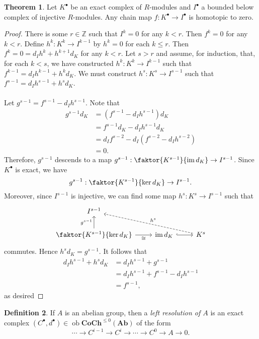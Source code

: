 \documentclass[10pt,letterpaper,cm]{nupset}
\theoremstyle{definition}
\newtheorem{definition}{Definition}[subsection]
\theoremstyle{theorem}
\newtheorem{theorem}[definition]{Theorem}
\theoremstyle{remark}
\newcommand{\Z}{\mathbb Z}
\newcommand{\1}{\mathbf{1}}
\newcommand{\0}{\vec 0}
\DeclareMathOperator{\im}{im}
\DeclareMathOperator{\ob}{ob}
\begin{document}
\begin{theorem}
Let $K^{\bullet}$ be an exact complex of $R$-modules and $I^{\bullet}$ a bounded below complex of injective $R$-modules. Any chain map $f: K^{\bullet} \to I^{\bullet}$ is homotopic to zero.
\end{theorem}
\begin{proof}
There is some $r\in \Z$ such that $I^k =0$ for any $k<r$. Then $f^k =0$ for any $k<r$. Define $h^k: K^k \to I^{k-1}$ by $h^k =0$ for each $k\leq r$. Then $f^{k} = 0 = d_I{h^{k}} + h^{k+1}{d_K}$ for any $k <r$. Let $s> r$ and assume, for induction, that, for each $k<s$, we have constructed $h^k : K^k \to I^{k-1}$ such that $f^{k-1} = d_I{h^{k-1}} + h^{k}{d_K}$. We must construct $h^s : K^s \to I^{s-1}$ such that $f^{s-1} = d_I{h^{s-1}} + h^{s}{d_K}$.
\\ \\ Let $g^{s-1} = f^{s-1} - d_I{h^{s-1}}$. Note that 
\begin{align*}
g^{s-1}{d_K} & = \left(f^{s-1} - d_I{h^{s-1}}\right){d_K}
\\ & = f^{s-1}{d_K} -  d_I{h^{s-1}}{d_K}
\\ & = d_I{f^{s-2}} - d_I\left(f^{s-2} - d_Ih^{s-2}\right)
\\ & = 0.
\end{align*}
Therefore, $g^{s-1}$ descends to a map ${g}^{s-1} : \faktor{K^{s-1}}{\im{d_K}} \to I^{s-1}$. Since $K^{\bullet}$ is exact, we have $${g}^{s-1} : \faktor{K^{s-1}}{\ker{d_K}} \to I^{s-1}.$$ Moreover, since $I^{s-1}$ is injective, we can find some map $h^s : K^s \to I^{s-1}$ such that
\[
\begin{tikzcd}
I^{s-1}                                                              &                          &                                 \\
\faktor{K^{s-1}}{\ker{d_K}} \arrow[u, "g^{s-1}"] \arrow[r, "\cong"'] & \im{d_K} \arrow[r, hook] & K^s \arrow[llu, "h^s"', dashed]
\end{tikzcd}
\] commutes. Hence $h^s{d_K} = g^{s-1}$. It follows that
\begin{align*}
  d_I{h^{s-1}} + h^{s}{d_K} & = d_I{h^{s-1}} + g^{s-1}
\\ & = d_I{h^{s-1}} + f^{s-1} - d_I{h^{s-1}}
\\ & = f^{s-1},
\end{align*}
as desired
\end{proof}

\medskip

\begin{definition}
If $A$ is an abelian group, then a \textit{left resolution of $A$} is an exact complex $(C^{\bullet}, d^{\bullet}) \in \ob{\mathbf{CoCh}^{\leq 0}(\mathbf{Ab})}$  of the form $$\cdots \to C^{i-1} \to C^i \to \cdots \to  C^0 \to A \to 0 .$$
\end{definition}
\end{document}
